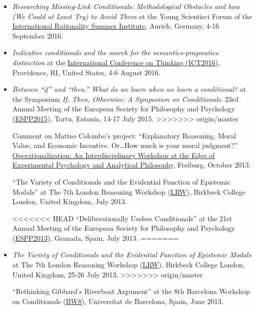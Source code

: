 \documentclass[11pt,article,oneside]{memoir}
\begin{document}
  \begin{itemize}
  	\item \emph{Researching Missing-Link Conditionals: Methodological Obstacles and how (We Could at Least Try) to Avoid Them} at the Young Scientisci Forum of the \href{https://irsi2016.de}{International Rationality Summer Institute}, Aurich, Germany, 4-16 September 2016. 

    \item \emph{Indicative conditionals and the search for the semantics-pragmatics distinction} at the \href{http://sites.clps.brown.edu/ict2016/}{International Conference on Thinking (ICT2016)}, Providence, RI, United States, 4-6 August 2016. 

    \item \emph{Between ``if'' and ``then.'' What do we learn when we learn a conditional?} at the Symposium \emph{If, Then, Otherwise: A Symposium on Conditionals}. 23rd Annual Meeting of the European Society for Philosophy and Psychology (\href{http://espp2015.ut.ee}{ESPP2015}), Tartu, Estonia, 14-17 July 2015.
>>>>>>> origin/master

	\ind Comment on Matteo Colombo's project: ``Explanatory Reasoning, Moral Value, and Economic Incentive. Or\ldots How much is your moral judgment?'' 
    \href{http://www.psychologie.uni-freiburg.de/Members/singmann/operational2013}{Operationalization: An Interdisciplinary Workshop at the Edge of Experimental Psychology and Analytical Philosophy}, Freiburg, October 2013.

    \ind ``The Variety of Conditionals and the Evidential Function of Epistemic Modals'' at The 7th London Reasoning Workshop (\href{http://www.bbk.ac.uk/psychology/about-us/events/the-7th-london-reasoning-workshop}{LRW}), Birkbeck College London, United Kingdom, July 2013.

<<<<<<< HEAD
    \ind ``Deliberationally Useless Conditionals'' at the 21st Annual Meeting of the European Society for Philosophy and Psychology (\href{http://espp2013.com}{ESPP2013}), Granada, Spain, July 2013.
=======
    \item \emph{The Variety of Conditionals and the Evidential Function of Epistemic Modals} at The 7th London Reasoning Workshop (\href{http://www.bbk.ac.uk/psychology/about-us/events/the-7th-london-reasoning-workshop}{LRW}), Birkbeck College London, United Kingdom, 25-26 July 2013.
>>>>>>> origin/master

    \ind ``Rethinking Gibbard’s Riverboat Argument'' at the 8th Barcelona Workshop on Conditionals (\href{http://www.ub.edu/logosbw/bw8/index.html}{BW8}), Universitat de Barcelona, Spain, June 2013.


\end{itemize}
\end{document}
